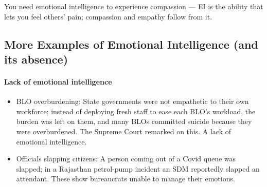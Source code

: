 \begin{KeyConcept}
You need emotional intelligence to experience compassion --- EI is the ability that lets you feel others' pain; compassion and empathy follow from it.
\end{KeyConcept}

\subsection{More Examples of Emotional Intelligence (and its absence)}

\paragraph{Lack of emotional intelligence}
\begin{itemize}
\item BLO overburdening: State governments were not empathetic to their own workforce; instead of deploying fresh staff to ease each BLO's workload, the burden was left on them, and many BLOs committed suicide because they were overburdened. The Supreme Court remarked on this. A lack of emotional intelligence.
\item Officials slapping citizens: A person coming out of a Covid queue was slapped; in a Rajasthan petrol-pump incident an SDM reportedly slapped an attendant. These show bureaucrats unable to manage their emotions.
\end{itemize}

